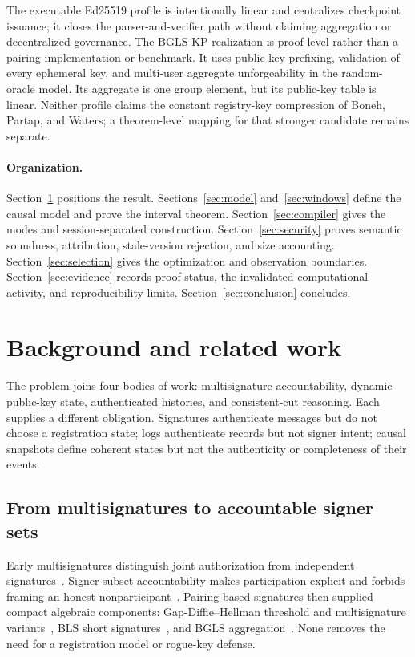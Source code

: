 \documentclass[11pt]{article}
\theoremstyle{definition}
\begin{document}
The executable Ed25519 profile is intentionally linear and centralizes checkpoint issuance; it closes the parser-and-verifier path without claiming aggregation or decentralized governance.  The BGLS-KP realization is proof-level rather than a pairing implementation or benchmark.  It uses public-key prefixing, validation of every ephemeral key, and multi-user aggregate unforgeability in the random-oracle model.  Its aggregate is one group element, but its public-key table is linear.  Neither profile claims the constant registry-key compression of Boneh, Partap, and Waters; a theorem-level mapping for that stronger candidate remains separate.

\paragraph{Organization.}
Section~\ref{sec:related} positions the result.  Sections~\ref{sec:model} and~\ref{sec:windows} define the causal model and prove the interval theorem.  Section~\ref{sec:compiler} gives the modes and session-separated construction.  Section~\ref{sec:security} proves semantic soundness, attribution, stale-version rejection, and size accounting.  Section~\ref{sec:selection} gives the optimization and observation boundaries.  Section~\ref{sec:evidence} records proof status, the invalidated computational activity, and reproducibility limits.  Section~\ref{sec:conclusion} concludes.

\section{Background and related work}\label{sec:related}
The problem joins four bodies of work: multisignature accountability, dynamic public-key state, authenticated histories, and consistent-cut reasoning.  Each supplies a different obligation.  Signatures authenticate messages but do not choose a registration state; logs authenticate records but not signer intent; causal snapshots define coherent states but not the authenticity or completeness of their events.

\subsection{From multisignatures to accountable signer sets}
Early multisignatures distinguish joint authorization from independent signatures~\cite{itakura1983multisignatures}.  Signer-subset accountability makes participation explicit and forbids framing an honest nonparticipant~\cite{micali2001accountable}.  Pairing-based signatures then supplied compact algebraic components: Gap-Diffie--Hellman threshold and multisignature variants~\cite{boldyreva2003threshold}, BLS short signatures~\cite{boneh2001short}, and BGLS aggregation~\cite{boneh2003aggregate}.  None removes the need for a registration model or rogue-key defense.
\end{document}
